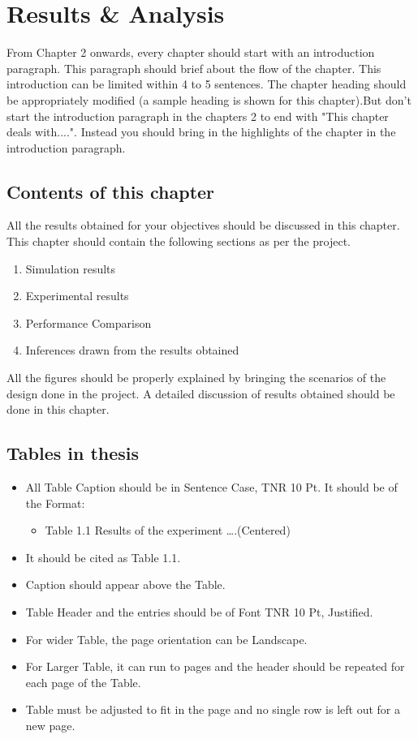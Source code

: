 \chapter{Results \& Analysis}
\indent\indent From Chapter 2 onwards, every chapter should start with an introduction paragraph. This paragraph should brief about the flow of the chapter. This introduction can be limited within 4 to 5 sentences. The chapter heading should be appropriately modified (a sample heading is shown for this chapter).But don't start the introduction paragraph in the chapters 2 to end with "This chapter deals with....". Instead you should bring in the highlights of the chapter in the introduction paragraph.
\section{Contents of this chapter}
All the results obtained for your objectives should be discussed in this chapter. This chapter should contain the following sections as per the project.
\begin{enumerate}
\item Simulation results
\item Experimental results
\item Performance Comparison
\item Inferences drawn from the results obtained
\end{enumerate}
All the figures should be properly explained by bringing the scenarios of the design done in the project. A detailed discussion of results obtained should be done in this chapter.

\section{Tables in thesis}
\begin{itemize}
	\item All Table Caption should be in Sentence Case, TNR 10 Pt. It should be of the Format:
	\begin{itemize}
		\item Table 1.1 Results of the experiment ….(Centered)
	\end{itemize}
	\item It should be cited as Table 1.1.
	\item Caption should appear above the Table.
	\item Table Header and the entries should be of Font TNR 10 Pt, Justified.
	\item For wider Table, the page orientation can be Landscape.
	\item For Larger Table, it can run to pages and the header should be repeated for each page of the Table.
	\item Table must be adjusted to fit in the page and no single row is left out for a new page.	
\end{itemize}

